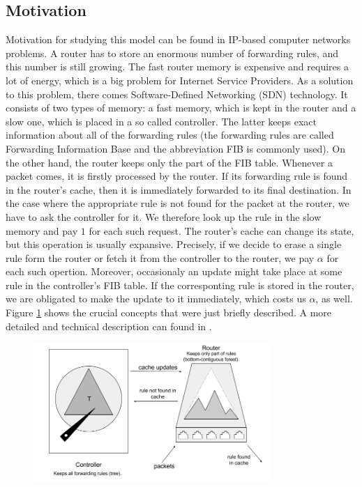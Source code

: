\subsection{Motivation} Motivation for studying this model can be found in 
IP-based computer networks problems. A router has to store an enormous number of
forwarding rules, and this number is still growing. The fast router memory is
expensive and requires a lot of energy, which is a big problem for Internet
Service Providers. As a solution to this problem, there comes Software-Defined
Networking (SDN) technology. It consists of two types of memory: a fast memory,
which is kept in the router and a slow one, which is placed in a so called controller.
The latter keeps exact information about all of the forwarding rules (the
forwarding rules are called Forwarding Information Base and the abbreviation FIB
is commonly used).  On the other hand, the router keeps only the part of the FIB
table. Whenever a packet comes, it is firstly processed by the router. If its
forwarding rule is found in the router's cache, then it is immediately forwarded
to its final destination. In the case where the appropriate rule is not found for
the packet at the router, we have to ask the controller for it. We therefore look
up the rule in the slow memory and pay $1$ for each such request. The router's
cache can change its state, but this operation is usually expansive. Precisely,
if we decide to erase a single rule form the router or fetch it from the
controller to the router, we pay $\alpha$ for each such opertion. Moreover,
occasionaly an update might take place at some rule in the controller's FIB table.
If the corresponting rule is stored in the router, we are obligated to make the
update to it immediately, which costs us $\alpha$, as well. Figure
\ref{fig:motivation} shows the crucial concepts that were just briefly
described. A more detailed and technical description can found in \cite{sdn}.
\begin{figure} \begin{center}
\includegraphics[width=0.8\textwidth]{motivation.png} \end{center} \caption{}
\label{fig:motivation} \end{figure}

